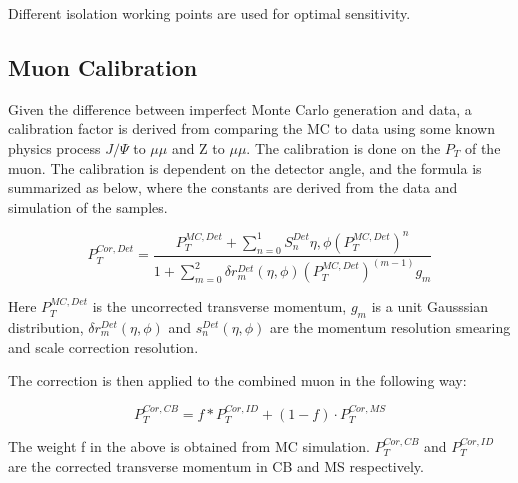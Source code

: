 Different isolation working points are used for optimal sensitivity. 


\subsection{Muon Calibration}
Given the difference between imperfect Monte Carlo generation and data, a calibration factor is derived from comparing the MC to data using some known physics process $J/\Psi$ to $\mu \mu$ and Z to $\mu \mu$. The calibration is done on the $P_{T}$ of the muon. 
The calibration is dependent on the detector angle, and the formula is summarized as below, where the constants are derived from the data and simulation of the samples.


\begin{equation}
P_{T}^{Cor,Det} = \frac{P^{MC, Det}_{T} + \sum_{n=0}^{1} S_{n}^{Det}{\eta, \phi}(P_{T}^{MC, Det})^n}{1+\sum_{m=0}^{2}\delta r_{m}^{Det}(\eta, \phi)(P_{T}^{MC, Det})^(m-1) g_{m}}
\label{eq:muoncalib}
\end{equation}

Here $P_{T}^{MC, Det}$ is the uncorrected transverse momentum, $g_m$ is a unit Gausssian distribution, $\delta r^{Det}_{m}(\eta, \phi)$ and $s_{n}^{Det}(\eta, \phi)$ are the momentum resolution smearing and scale correction resolution. 

The correction is then applied to the combined muon in the following way:

\begin{equation}
P_{T}^{Cor, CB} = f *P_{T}^{Cor, ID}+ (1-f) \cdot P_{T}^{Cor, MS}
\label{eq:muoncalibfactor}
\end{equation}

The weight f in the above is obtained from MC simulation. $P_T^{Cor, CB}$ and $P_T^{Cor,ID}$ are the corrected transverse momentum in CB and MS respectively.






